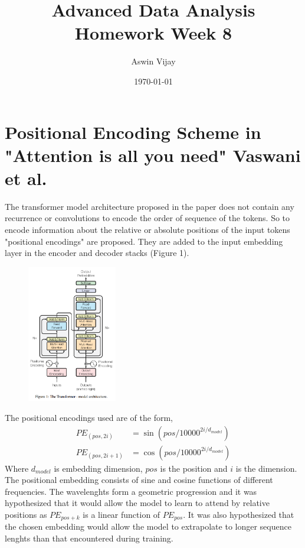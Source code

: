 \documentclass{article}
\title{Advanced Data Analysis\\Homework Week 8}
\author{Aswin Vijay}
\date\today
\begin{document}
\maketitle %

\section*{Positional Encoding Scheme in "Attention is all you need" Vaswani et al.}
The transformer model architecture proposed in the paper does not 
contain any recurrence or convolutions to encode the order of sequence of the tokens. So 
to encode information about the relative or absolute positions of the input tokens "positional encodings" are
proposed. They are added to the input embedding layer in the encoder and decoder stacks (Figure 1).
\begin{figure}[h]
    \centering
    \includegraphics[width=0.35\textwidth]{fig1.png}
\end{figure} 
The positional encodings used are of the form,
\begin{align*}
    PE_{(pos,2i)} &= \sin(pos/10000^{2i/d_{model}})\\
    PE_{(pos,2i+1)} &= \cos(pos/10000^{2i/d_{model}})
\end{align*}
Where $d_{model}$ is embedding dimension, $pos$ is the position and $i$ is the dimension. The positional embedding
consists of sine and cosine functions of different frequencies. The wavelenghts form a geometric progression and
it was hypothesized that it would allow the model to learn to attend by relative positions as $PE_{pos+k}$ is a linear function of $PE_{pos}$.
It was also hypothesized that the chosen embedding would allow the model to extrapolate to longer sequence lenghts than that encountered during training. 
\end{document}
